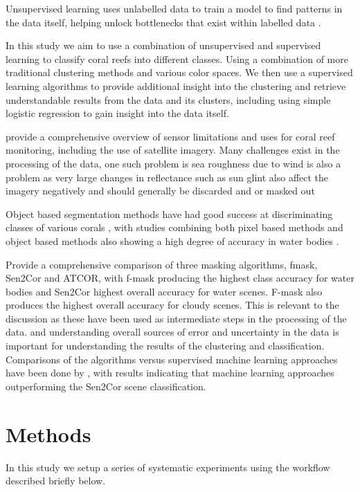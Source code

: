 \documentclass[journal,article,submit,pdftex,moreauthors]{Definitions/mdpi}
\begin{document}
Unsupervised learning uses unlabelled data to train a model to find patterns in the data itself, helping unlock bottlenecks that exist within labelled data \cite{usama2019unsupervised}.

In this study we aim to use a combination of unsupervised and supervised learning to classify coral reefs into different classes. Using a combination of more traditional clustering methods and various color spaces. 
We then use a supervised learning algorithms to provide additional insight into the clustering and 
retrieve understandable results from the data and its clusters, including using simple logistic regression to gain insight into the data itself.

\citep{Hedley2016} provide a comprehensive overview of sensor limitations and uses for coral reef monitoring, including the use of satellite imagery. Many challenges exist in the processing of the data, one such problem is 
sea roughness due to wind is also a problem as very large changes in reflectance such as sun glint also affect the imagery negatively  and should generally be discarded and or masked out \cite{gordon1997atmospheric}

Object based segmentation methods have had good success at discriminating classes of various corals \cite{Nguyen2021}, with studies combining both pixel based methods and object based methods 
also showing a high degree of accuracy in water bodies \cite{huang2015combining}.


\cite{zekoll2021comparison} Provide a comprehensive comparison of three masking algorithms, fmask, Sen2Cor and ATCOR, with f-mask producing the highest class accuracy for water bodies and Sen2Cor 
highest overall accuracy for water scenes. F-mask also produces the highest overall accuracy for cloudy scenes. This is relevant to the discussion as these have been used as intermediate steps in the processing of the data.
and understanding overall sources of error and uncertainty in the data is important for understanding the results of the clustering and classification. Comparisons of the algorithms versus supervised machine learning approaches have been
done by \cite{raiyani2021sentinel}, with results indicating that machine learning approaches outperforming the Sen2Cor scene classification.



\section{Methods}
In this study we setup a series of systematic experiments using the workflow described briefly below. 
\end{document}
